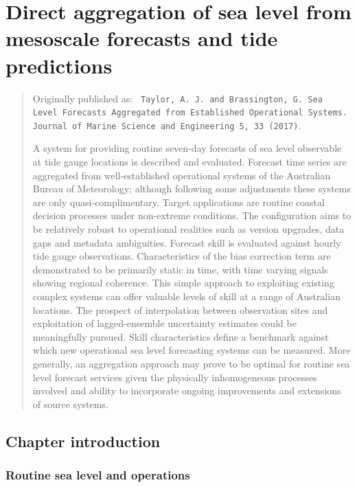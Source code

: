 \chapter{Direct aggregation of sea level from mesoscale forecasts and tide predictions}
\label{chp:aggregate}
\begin{quote}
{\small
Originally published as: \texttt{
Taylor, A. J. and Brassington, G. Sea Level Forecasts Aggregated from Established Operational Systems. Journal of Marine Science and Engineering 5, 33 (2017)}.

A system for providing routine seven-day forecasts of sea level observable at tide gauge locations is described and evaluated.
Forecast time series are aggregated from well-established operational systems of the Australian Bureau of Meteorology; although following some adjustments these systems are only quasi-complimentary.
Target applications are routine coastal decision processes under non-extreme conditions.
The configuration aims to be relatively robust to operational realities such as version upgrades, data gaps and metadata ambiguities.
Forecast skill is evaluated against hourly tide gauge observations.  
Characteristics of the bias correction term are demonstrated to be primarily static in time, with time varying signals showing regional coherence.
This simple approach to exploiting existing complex systems can offer valuable levels of skill at a range of Australian locations.
The prospect of interpolation between observation sites and exploitation of lagged-ensemble uncertainty estimates could be meaningfully pursued. 
Skill characteristics define a benchmark against which new operational sea level forecasting systems can be measured. 
More generally, an aggregation approach may prove to be optimal for routine sea level forecast services given the physically inhomogeneous processes involved and ability to incorporate ongoing improvements and extensions of source systems.
}
\end{quote}

\section{Chapter introduction}
\subsection{Routine sea level and operations}

